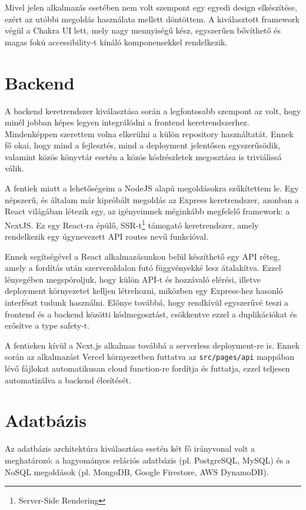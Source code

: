 Mivel jelen alkalmazás esetében nem volt szempont egy egyedi design elkészítése, ezért az utóbbi megoldás használata mellett döntöttem.
A kiválasztott framework végül a Chakra UI lett, mely nagy mennyiségű kész, egyszerűen bővíthető és magas fokú accessibility-t kínáló komponensekkel rendelkezik. \cite{ChakraUI}

\section{Backend}
A backend keretrendszer kiválasztása során a legfontosabb szempont az volt, hogy minél jobban képes legyen integrálódni a frontend keretrendszerhez.
Mindenképpen szerettem volna elkerülni a külön repository használtatát.
Ennek fő okai, hogy mind a fejlesztés, mind a deployment jelentősen egyszerűsödik, valamint közös könyvtár esetén a közös kódrészletek megosztása is triviálissá válik.

A fentiek miatt a lehetőségeim a NodeJS alapú megoldásokra szűkítettem le. Egy népszerű, és általam már kipróbált megoldás az Express keretrendszer, azonban a React világában létezik egy, az igényeimnek méginkább megfelelő framework: a NextJS.
Ez egy React-ra épülő, SSR-t\footnote{Server-Side Rendering} támogató keretrendszer, amely rendelkezik egy úgynevezett API routes nevű funkcióval.

Ennek segítségével a React alkalmazásunkon belül készíthető egy API réteg, amely a fordítás után szerveroldalon futó függvényekké lesz átalakítva.
Ezzel lényegében megspóroljuk, hogy külön API-t és hozzávaló elérési, illetve deployment környezetet kelljen létrehozni, miközben egy Express-hez hasonló interfészt tudunk használni.
Előnye továbbá, hogy rendkívül egyszerűvé teszi a frontend és a backend közötti kódmegosztást, csökkentve ezzel a duplikációkat és erősítve a type safety-t.

A fentieken kívül a Next.js alkalmas továbbá a serverless deployment-re is. Ennek során az alkalmazást Vercel környezetben futtatva az \lstinline|src/pages/api| mappában lévő fájlokat
automatikusan cloud function-re fordítja és futtatja, ezzel teljesen automatizálva a backend élesítését. \cite{NextJS}

\section{Adatbázis}
Az adatbázis architektúra kiválasztása esetén két fő irányvonal volt a meghatározó: a hagyományos relációs adatbázis (pl. PostgreSQL, MySQL) és a NoSQL megoldások (pl. MongoDB, Google Firestore, AWS DynamoDB).

